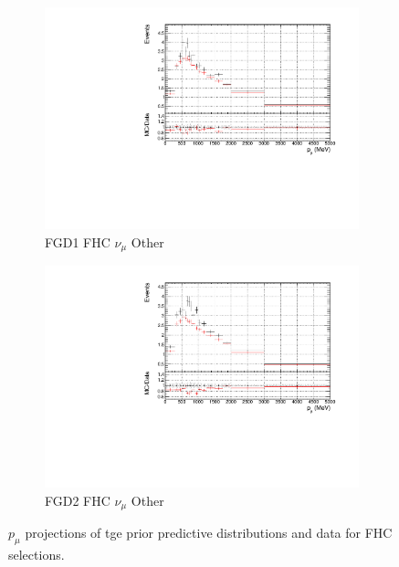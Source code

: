 \begin{figure}[!h]
\begin{subfigure}{0.49\textwidth}
  \centering
  \includegraphics[width=\textwidth]{figs/prioronly1D_p_FGD1_numuCC_other}
  \caption{FGD1 FHC $\nu_{\mu}$ Other}
\end{subfigure}
\begin{subfigure}{0.49\textwidth}
  \centering
  \includegraphics[width=\textwidth]{figs/prioronly1D_p_FGD2_numuCC_other}
  \caption{FGD2 FHC $\nu_{\mu}$ Other}
  \label{fig:priorpost_FGD2_numuCC_other}
\end{subfigure}
\caption{$p_{\mu}$ projections of tge prior predictive distributions and data for FHC \numu selections.}
\label{fig:priorpost_fhc_p}
\end{figure}

